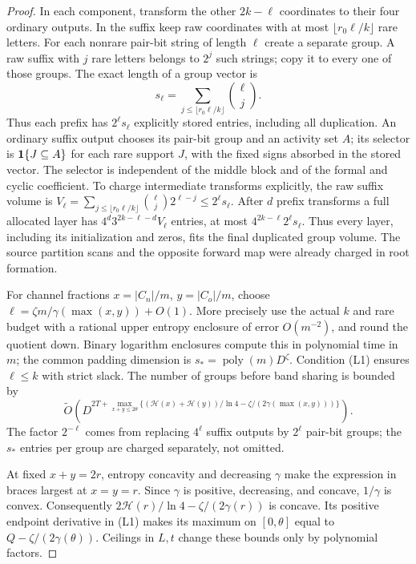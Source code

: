 \documentclass[11pt]{article}
\newcommand{\softO}{\widetilde O}
\newcommand{\HH}{\mathcal H}
\begin{document}
\begin{proof}
In each component, transform the other $2k-\ell$ coordinates to
their four ordinary outputs. In the suffix keep raw coordinates
with at most $\lfloor r_0\ell/k\rfloor$ rare letters. For each
nonrare pair-bit string of length $\ell$ create a separate group.
A raw suffix with $j$ rare letters belongs to $2^j$ such strings;
copy it to every one of those groups. The exact length of a group
vector is
\[
 s_\ell=\sum_{j\le\lfloor r_0\ell/k\rfloor}\binom{\ell}{j}.
\]
Thus each prefix has $2^\ell s_\ell$ explicitly stored entries,
including all duplication. An ordinary suffix output chooses its
pair-bit group and an activity set $A$; its selector is
${\bf1}\{J\subseteq A\}$ for each rare support $J$, with the fixed
signs absorbed in the stored vector. The selector is independent
of the middle block and of the formal and cyclic coefficient.
To charge intermediate transforms explicitly, the raw suffix volume is
$V_\ell=\sum_{j\le\lfloor r_0\ell/k\rfloor}
\binom{\ell}{j}2^{\ell-j}\le2^\ell s_\ell$.
After $d$ prefix transforms a full allocated layer has
$4^d3^{2k-\ell-d}V_\ell$ entries, at most
$4^{2k-\ell}2^\ell s_\ell$. Thus every layer, including its
initialization and zeros, fits the final duplicated group volume.
The source partition scans and the opposite forward map were
already charged in root formation.

For channel fractions $x=|C_n|/m$, $y=|C_o|/m$, choose
$\ell=\zeta m/\gamma(\max(x,y))+O(1)$. More precisely use the actual
$k$ and rare budget with a rational upper entropy enclosure of
error $O(m^{-2})$, and round the quotient down. Binary logarithm
enclosures compute this in polynomial time in $m$; the common
padding dimension is $s_*=\operatorname{poly}(m)D^\zeta$.
Condition (L1) ensures $\ell\le k$ with strict slack.
The number of groups before band sharing is bounded by
\[
 \softO\left(
 D^{2T+\max_{x+y\le2\theta}
  \{(\HH(x)+\HH(y))/\ln4-\zeta/(2\gamma(\max(x,y)))\}}\right).
                                                               \tag{L3}
\]
The factor $2^{-\ell}$ comes from replacing $4^\ell$ suffix
outputs by $2^\ell$ pair-bit groups; the $s_*$ entries per group
are charged separately, not omitted.

At fixed $x+y=2r$, entropy concavity and decreasing $\gamma$
make the expression in braces largest at $x=y=r$. Since $\gamma$
is positive, decreasing, and concave, $1/\gamma$ is convex.
Consequently $2\HH(r)/\ln4-\zeta/(2\gamma(r))$ is concave.
Its positive endpoint derivative in (L1) makes its maximum on
$[0,\theta]$ equal to $Q-\zeta/(2\gamma(\theta))$.
Ceilings in $L,t$ change these bounds only by polynomial factors.


\end{proof}
\end{document}
